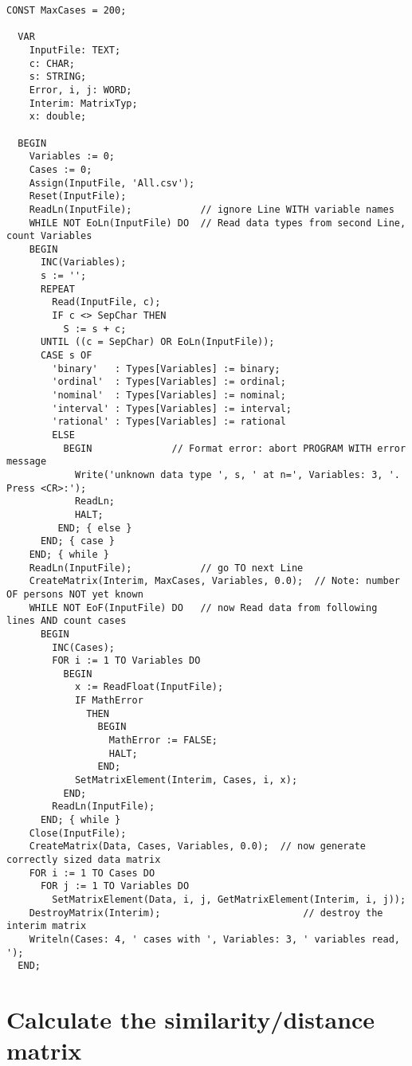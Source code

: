 \begin{refsection}
\begin{lstlisting}[caption=Read data from comma-separated file]
  CONST MaxCases = 200;

  VAR
    InputFile: TEXT;
    c: CHAR;
    s: STRING;
    Error, i, j: WORD;
    Interim: MatrixTyp;
    x: double;

  BEGIN
    Variables := 0;
    Cases := 0;
    Assign(InputFile, 'All.csv');
    Reset(InputFile);
    ReadLn(InputFile);            // ignore Line WITH variable names
    WHILE NOT EoLn(InputFile) DO  // Read data types from second Line, count Variables
    BEGIN
      INC(Variables);
      s := '';
      REPEAT
        Read(InputFile, c);
        IF c <> SepChar THEN
          S := s + c;
      UNTIL ((c = SepChar) OR EoLn(InputFile));
      CASE s OF
        'binary'   : Types[Variables] := binary;
        'ordinal'  : Types[Variables] := ordinal;
        'nominal'  : Types[Variables] := nominal;
        'interval' : Types[Variables] := interval;
        'rational' : Types[Variables] := rational
        ELSE
          BEGIN              // Format error: abort PROGRAM WITH error message
            Write('unknown data type ', s, ' at n=', Variables: 3, '. Press <CR>:');
            ReadLn;
            HALT;
         END; { else }
      END; { case }
    END; { while }
    ReadLn(InputFile);            // go TO next Line
    CreateMatrix(Interim, MaxCases, Variables, 0.0);  // Note: number OF persons NOT yet known
    WHILE NOT EoF(InputFile) DO   // now Read data from following lines AND count cases
      BEGIN
        INC(Cases);
        FOR i := 1 TO Variables DO
          BEGIN
            x := ReadFloat(InputFile);
            IF MathError
              THEN
                BEGIN
                  MathError := FALSE;
                  HALT;
                END;
            SetMatrixElement(Interim, Cases, i, x);
          END;
        ReadLn(InputFile);
      END; { while }
    Close(InputFile);
    CreateMatrix(Data, Cases, Variables, 0.0);  // now generate correctly sized data matrix
    FOR i := 1 TO Cases DO
      FOR j := 1 TO Variables DO
        SetMatrixElement(Data, i, j, GetMatrixElement(Interim, i, j));
    DestroyMatrix(Interim);                         // destroy the interim matrix
    Writeln(Cases: 4, ' cases with ', Variables: 3, ' variables read, ');
  END;
\end{lstlisting}

\section{Calculate the similarity/distance matrix}


\end{refsection}
